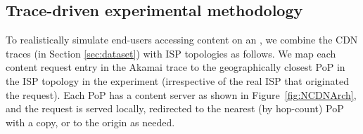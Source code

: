 
%
%
%
%
%
%
%


%





\subsection{Trace-driven experimental methodology}
\label{sec:simulations}
To realistically simulate end-users accessing content on an \ncp, we combine the CDN traces  (in Section \ref{sec:dataset}) with ISP topologies as follows.   
We map each content request entry in the Akamai trace to the geographically closest PoP in the ISP topology in the experiment (irrespective of the real ISP that originated the request). 
Each PoP has a content server as shown in Figure~\ref{fig:NCDNArch}, and the request is served locally, redirected to the nearest  (by hop-count) PoP with a copy, or to the origin as needed. 

